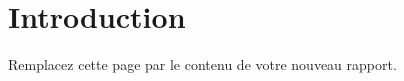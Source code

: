 \documentclass[11pt,a4paper]{article}
\begin{document}

\section{Introduction}
Remplacez cette page par le contenu de votre nouveau rapport.
\end{document}
